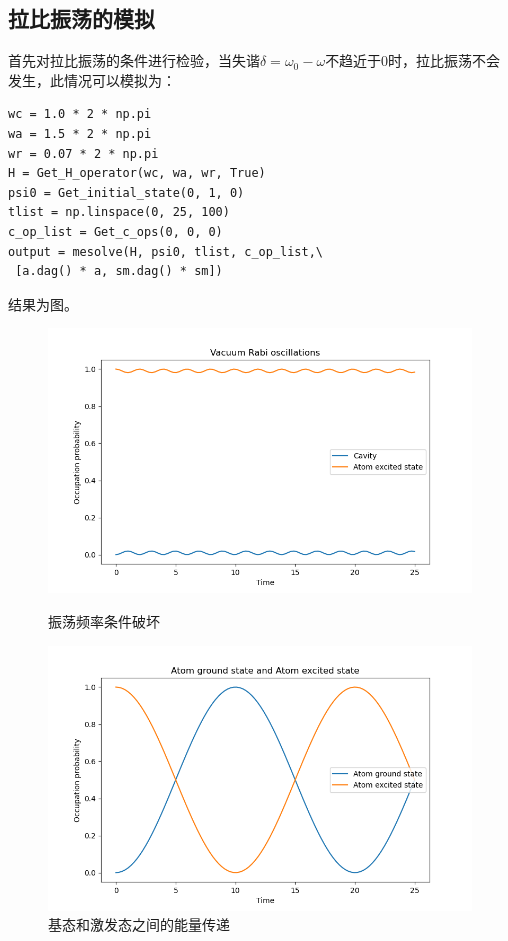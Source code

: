 \documentclass{ctexart}
\begin{document}
\subsection{拉比振荡的模拟}
首先对拉比振荡的条件进行检验，当失谐$\delta = \omega_0 - \omega$不趋近于0时，拉比振荡不会发生，此情况可以模拟为：

\begin{verbatim}
wc = 1.0 * 2 * np.pi
wa = 1.5 * 2 * np.pi
wr = 0.07 * 2 * np.pi
H = Get_H_operator(wc, wa, wr, True)
psi0 = Get_initial_state(0, 1, 0)
tlist = np.linspace(0, 25, 100)
c_op_list = Get_c_ops(0, 0, 0)
output = mesolve(H, psi0, tlist, c_op_list,\
 [a.dag() * a, sm.dag() * sm])
\end{verbatim}

结果为图。
\begin{figure}[htbp]
    \begin{minipage}[t]{0.5\linewidth}
        \includegraphics[width=0.7\linewidth]{1.png}
        \caption{振荡频率条件破坏}
        \label{fig:1}
    \end{minipage}%
    \begin{minipage}[t]{0.5\linewidth}
        \includegraphics[width=0.7\linewidth]{2.png}
        \caption{基态和激发态之间的能量传递}
        \label{fig:2}
    \end{minipage}
\end{figure}
\end{document}
